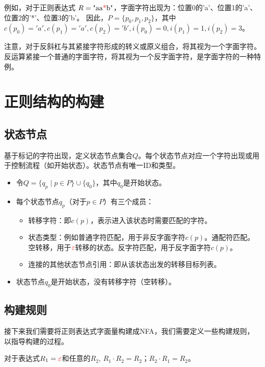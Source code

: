 \documentclass[12pt,a4paper,UTF8]{ctexart}
\newcommand{\func}[1]{\textcolor{red}{#1}}
\begin{document}
例如，对于正则表达式 $R = \text{"aa\func{*}b"}$，字面字符出现为：位置0的'a'、位置1的'a'、位置2的'*'、位置3的'b'。
因此，$P = \{p_0, p_1, p_2\}$，其中$c(p_0) = 'a', c(p_1) = 'a', c(p_2) = 'b', i(p_0) = 0, i(p_1) = 1, i(p_2) = 3$。

\qquad 注意，对于反斜杠与其紧接字符形成的转义或原义组合，将其视为一个字面字符。
反运算紧接一个普通的字面字符，将其视为一个反字面字符，是字面字符的一种特例。




\newpage
\section{正则结构的构建}

\subsection{状态节点}

\qquad 基于标记的字符出现，定义状态节点集合$Q$。每个状态节点对应一个字符出现或用于控制流程（如开始状态）。状态节点有唯一ID和类型。
\begin{itemize}
    \item 令$Q = \{ q_p \mid p \in P \} \cup \{ q_0 \}$，其中$q_0$是开始状态。
    \item 每个状态节点$q_p$（对于$p \in P$）有三个成员：
    \begin{itemize}
        \item 转移字符：即$c(p)$，表示进入该状态时需要匹配的字符。
        \item 状态类型：例如普通字符匹配，用于非反字面字符$c(p)$。通配符匹配。空转移，用于$\func{\varepsilon}$转移的状态。反字符匹配，用于反字面字符$c(p)$。
        \item 连接的其他状态节点引用：即从该状态出发的转移目标列表。
    \end{itemize}
    \item 状态节点$q_0$是开始状态，没有转移字符（空转移）。
\end{itemize}

\subsection{构建规则}

\qquad 接下来我们需要将正则表达式字面量构建成NFA，我们需要定义一些构建规则，以指导构建的过程。

\qquad 对于表达式$R_1 = \func{\varepsilon}$和任意的$R_2$, $R_1 \cdot R_2 = R_2$；$R_2 \cdot R_1 = R_2$。
\end{document}
